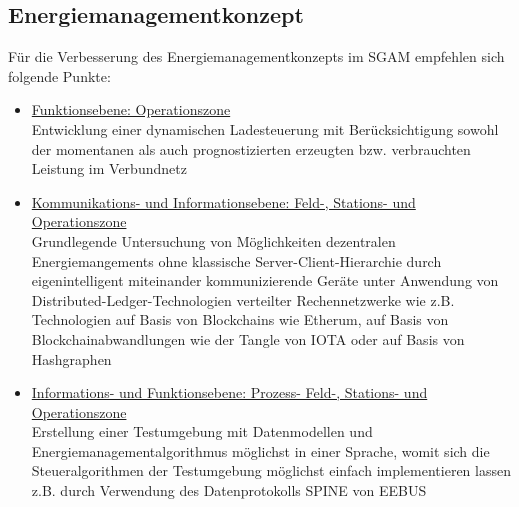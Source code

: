 \subsection{Energiemanagementkonzept}
	Für die Verbesserung des Energiemanagementkonzepts im SGAM empfehlen sich folgende Punkte:    
    \begin{itemize}
        \item \underline{Funktionsebene: Operationszone} \\ 
        	Entwicklung einer dynamischen Ladesteuerung mit Berücksichtigung sowohl der momentanen als auch prognostizierten erzeugten bzw. verbrauchten Leistung im Verbundnetz
		\item \underline{Kommunikations- und Informationsebene: Feld-, Stations- und Operationszone} \\ 
			Grundlegende Untersuchung von Möglichkeiten dezentralen Energiemangements ohne klassische Server-Client-Hierarchie durch eigenintelligent miteinander kommunizierende Geräte unter Anwendung von Distributed-Ledger-Technologien verteilter Rechennetzwerke wie z.B. Technologien auf Basis von Blockchains wie Etherum, auf Basis von Blockchainabwandlungen wie der Tangle von IOTA oder auf Basis von Hashgraphen
        \item \underline{Informations- und Funktionsebene: Prozess- Feld-, Stations- und Operationszone} \\ 
        	Erstellung einer Testumgebung mit Datenmodellen und Energiemanagementalgorithmus möglichst in einer Sprache, womit sich die Steueralgorithmen der Testumgebung möglichst einfach implementieren lassen z.B. durch Verwendung des Datenprotokolls SPINE von EEBUS
    \end{itemize}
    
    
